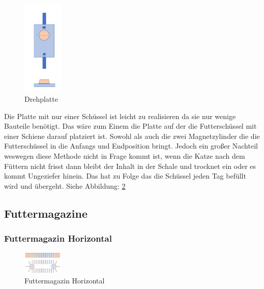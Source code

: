 \begin{figure}
\vspace{-40pt}
  \begin{center}
    \includegraphics[width=0.17\textwidth]{Bilder/Powerpoint/Einschuessel_platte}
  \end{center}
  \caption{Drehplatte}
  \label{Schüssel Eins}
  \vspace{-20pt}
\end{figure}

Die Platte mit nur einer Schüssel ist leicht zu realisieren da sie nur wenige Bauteile benötigt. Das wäre zum Einem die Platte auf der die Futterschüssel mit einer Schiene darauf platziert ist. Sowohl als auch die zwei Magnetzylinder die die Futterschüssel in die Anfangs und Endposition bringt. Jedoch ein großer Nachteil weswegen diese Methode nicht in Frage kommt ist, wenn die Katze nach dem Füttern nicht frisst dann bleibt der Inhalt in der Schale und trocknet ein oder es kommt Ungeziefer hinein. Das hat zu Folge das die Schüssel jeden Tag befüllt wird und übergeht. Siehe Abbildung: \ref{Schüssel Eins}


\subsection{Futtermagazine}

\subsubsection{Futtermagazin Horizontal}

\begin{figure}
\vspace{-40pt}
  \begin{center}
    \includegraphics[width=0.17\textwidth]{Bilder/Powerpoint/Futtermagazin_horizontal}
  \end{center}
  \caption{Futtermagazin Horizontal}
  \label{Schüssel Eins}
  \vspace{-20pt}
\end{figure}



